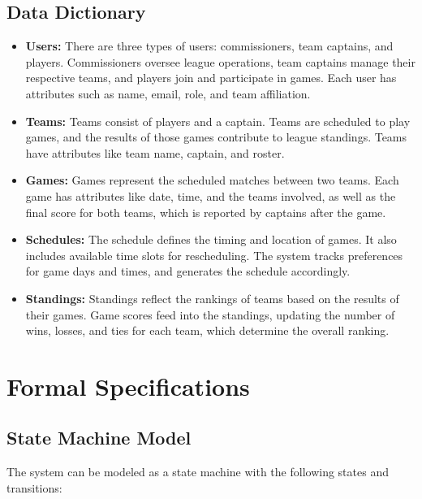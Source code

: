\documentclass[12pt, titlepage]{article}
\begin{document}
\subsection{Data Dictionary}
\begin{itemize}
    \item \textbf{Users:} There are three types of users: commissioners, team captains, and players. Commissioners oversee league operations, team captains manage their respective teams, and players join and participate in games. Each user has attributes such as name, email, role, and team affiliation.
    
    \item \textbf{Teams:} Teams consist of players and a captain. Teams are scheduled to play games, and the results of those games contribute to league standings. Teams have attributes like team name, captain, and roster.
    
    \item \textbf{Games:} Games represent the scheduled matches between two teams. Each game has attributes like date, time, and the teams involved, as well as the final score for both teams, which is reported by captains after the game.
    
    \item \textbf{Schedules:} The schedule defines the timing and location of games. It also includes available time slots for rescheduling. The system tracks preferences for game days and times, and generates the schedule accordingly.
    
    \item \textbf{Standings:} Standings reflect the rankings of teams based on the results of their games. Game scores feed into the standings, updating the number of wins, losses, and ties for each team, which determine the overall ranking.
\end{itemize}

\section{Formal Specifications}
\subsection{State Machine Model}
The system can be modeled as a state machine with the following states and transitions:
\end{document}
